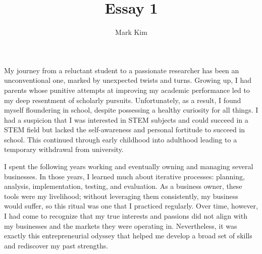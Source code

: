 \documentclass[12pt]{article}
\author{Mark Kim}
\title{Essay 1}
\begin{document}
\maketitle


My journey from a reluctant student to a passionate researcher has been an unconventional one, marked by unexpected twists and
turns. Growing up, I had parents whose punitive attempts at improving my academic performance led to my deep resentment of scholarly
pursuits. Unfortunately, as a result, I found myself floundering in school, despite possessing a healthy curiosity for all things. I had a
suspicion that I was interested in STEM subjects and could succeed in a STEM field but lacked the self-awareness and personal fortitude to
succeed in school. This continued through early childhood into adulthood leading to a temporary withdrawal from university.

I spent the following years working and eventually owning and managing several businesses. In those years, I learned much about iterative
processes: planning, analysis, implementation, testing, and evaluation. As a business owner, these tools were my livelihood; without
leveraging them consistently, my business would suffer, so this ritual was one that I practiced regularly. Over time, however, I had come
to recognize that my true interests and passions did not align with my businesses and the markets they were operating in. Nevertheless, it
was exactly this entrepreneurial odyssey that helped me develop a broad set of skills and rediscover my past strengths.
\end{document}
